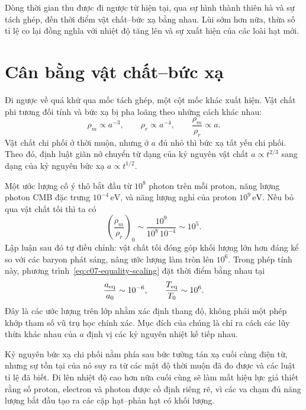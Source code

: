 Dòng thời gian thu được đi ngược từ hiện tại, qua sự hình thành thiên hà và sự tách ghép, đến thời điểm vật chất--bức xạ bằng nhau. Lùi sớm hơn nữa, thừa số tỉ lệ co lại đồng nghĩa với nhiệt độ tăng lên và sự xuất hiện của các loài hạt mới.

\section{Cân bằng vật chất--bức xạ}

Đi ngược về quá khứ qua mốc tách ghép, một cột mốc khác xuất hiện. Vật chất phi tương đối tính và bức xạ bị pha loãng theo những cách khác nhau:
\begin{equation}
\rho_m\propto a^{-3},
\qquad
\rho_r\propto a^{-4},
\qquad
\frac{\rho_m}{\rho_r}\propto a.
\label{eq:c07-equality-scaling}
\end{equation}
Vật chất chi phối ở thời muộn, nhưng ở \(a\) đủ nhỏ thì bức xạ tất yếu chi phối. Theo đó, định luật giãn nở chuyển từ dạng của kỷ nguyên vật chất \(a\propto t^{2/3}\) sang dạng của kỷ nguyên bức xạ \(a\propto t^{1/2}\).

Một ước lượng cố ý thô bắt đầu từ \(10^8\) photon trên mỗi proton, năng lượng photon CMB đặc trưng \(10^{-4}\,\mathrm{eV}\), và năng lượng nghỉ của proton \(10^9\,\mathrm{eV}\). Nếu bỏ qua vật chất tối thì ta có
\begin{equation}
\left(\frac{\rho_m}{\rho_r}\right)_0
\sim
\frac{10^9}{10^8\,10^{-4}}
\sim10^5.
\end{equation}
Lập luận sau đó tự điều chỉnh: vật chất tối đóng góp khối lượng lớn hơn đáng kể so với các baryon phát sáng, nâng ước lượng làm tròn lên \(10^6\). Trong phép tính này, phương trình~\eqref{eq:c07-equality-scaling} đặt thời điểm bằng nhau tại
\begin{equation}
\frac{a_{\rm eq}}{a_0}\sim10^{-6},
\qquad
\frac{T_{\rm eq}}{T_0}\sim10^6.
\label{eq:c07-equality-estimate}
\end{equation}
Đây là các ước lượng trên lớp nhằm xác định thang độ, không phải một phép khớp tham số vũ trụ học chính xác. Mục đích của chúng là chỉ ra cách các lũy thừa khác nhau của \(a\) định vị các kỷ nguyên nhiệt kế tiếp nhau.

Kỷ nguyên bức xạ chi phối nằm phía sau bức tường tán xạ cuối cùng điện từ, nhưng sự tồn tại của nó suy ra từ các mật độ thời muộn đã đo được và các luật tỉ lệ đã biết. Đi lên nhiệt độ cao hơn nữa cuối cùng sẽ làm mất hiệu lực giả thiết rằng số proton, electron và photon được cố định riêng rẽ, vì các va chạm đủ năng lượng bắt đầu tạo ra các cặp hạt--phản hạt có khối lượng.

